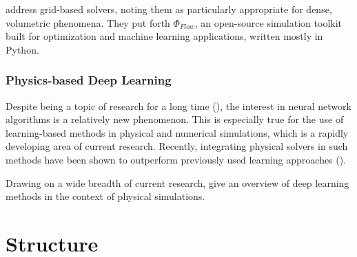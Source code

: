 \cite{holl2019pdecontrol} address grid-based solvers, noting them as
particularly appropriate for dense, volumetric phenomena. They put forth
$\Phi_{Flow}$, an open-source simulation toolkit built for optimization and
machine learning applications, written mostly in Python.

\subsubsection*{Physics-based Deep Learning}
Despite being a topic of research for a long time (\cite{backprop}), the
interest in neural network algorithms is a relatively new phenomenon. This is
especially true for the use of learning-based methods in physical and numerical
simulations, which is a rapidly developing area of current research. Recently,
integrating physical solvers in such methods have been shown to outperform
previously used learning approaches (\cite{solver-in-the-loop}).

Drawing on a wide breadth of current research, \cite{pbdl} give an overview of
deep learning methods in the context of physical simulations. 


\section{Structure}

